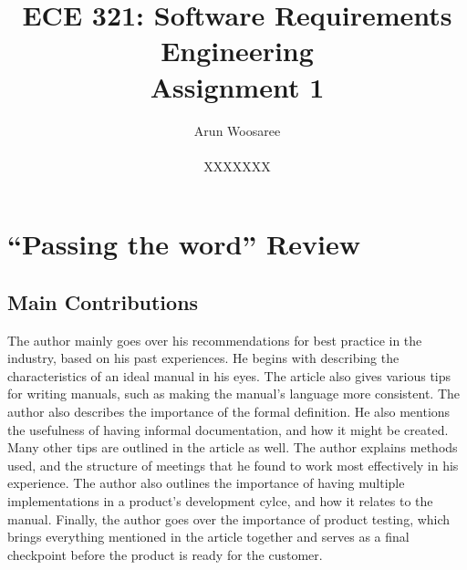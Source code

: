 \documentclass[letterpaper,12pt]{article}
\title{ECE 321: Software Requirements Engineering \\ Assignment 1}
\author{Arun Woosaree \\ \\ XXXXXXX}
\begin{document}
\maketitle

\section{``Passing the word'' Review}

\subsection{Main Contributions}

The author mainly goes over his recommendations  for best practice in the
industry, based on his past experiences. He begins with describing the
characteristics of an ideal manual in his eyes. The article also gives various
tips for writing manuals, such as making the manual's language more consistent.
The author also describes the importance of the formal definition. He also
mentions the usefulness of having informal documentation, and how it might be
created. Many other tips are outlined in the article as well. The author
explains methods used, and the structure of meetings that he found to work most
effectively in his experience. The author also outlines the importance of having
multiple implementations in a product's development cylce, and how it relates to
the manual.  Finally, the author goes over the importance of product testing,
which brings everything mentioned in the article together and serves as a final
checkpoint before the product is ready for the customer.
\end{document}
